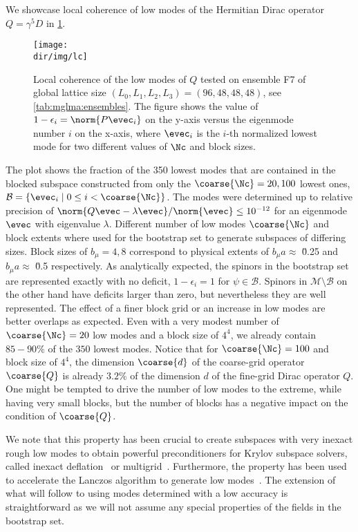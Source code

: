 We showcase local coherence of low modes of the Hermitian Dirac operator $Q = \gamma^{5} D$ in \cref{fig:lc}.
\begin{figure}
    \centering
    \texttt{[image: \\dir/img/lc]}
    \caption{Local coherence of the low modes of $Q$ tested on ensemble F7 of global lattice size $(L_0,L_1,L_2,L_3) = (96, 48, 48, 48)$, see \cref{tab:mglma:ensembles}. The figure shows the value of $1 - \epsilon_i = \norm{P \evec_i}$ on the y-axis versus the eigenmode number $i$ on the x-axis, where $\evec_i$ is the $i$-th normalized lowest mode for two different values of $\Nc$ and block sizes. \takenfull }
    \label{fig:lc}
\end{figure}
The plot shows the fraction of the \num{350} lowest modes that are contained in the blocked subspace constructed from only the $\coarse{\Nc} = 20, 100$ lowest ones, $\mathcal{B} = \{ \evec_i \mid 0 \leq i < \coarse{\Nc} \}$.
The modes were determined up to relative precision of $\norm{Q \evec - \lambda \evec}/\norm{\evec} \leq 10^{-12}$ for an eigenmode $\evec$ with eigenvalue $\lambda$.
Different number of low modes $\coarse{\Nc}$ and block extents where used for the bootstrap set to generate subspaces of differing sizes.
Block sizes of $b_{\mu} = 4, 8$ correspond to physical extents of $b_{\mu} a \approx $ \u{0.25}{\femto\metre} and $b_{\mu} a \approx $ \u{0.5}{\femto\metre} respectively.
As analytically expected, the spinors in the bootstrap set are represented exactly with no deficit, \ie $1 - \epsilon_i = 1$ for $\psi \in \mathcal{B}$.
Spinors in $\mathcal{M} \setminus \mathcal{B}$ on the other hand have deficits larger than zero, but nevertheless they are well represented.
The effect of a finer block grid or an increase in low modes are better overlaps as expected.
Even with a very modest number of $\coarse{\Nc}=20$ low modes and a block size of $4^4$, we already contain $85-90\%$ of the $350$ lowest modes.
Notice that for $\coarse{\Nc}=100$ and block size of $4^4$, the dimension $\coarse{d}$ of the coarse-grid operator $\coarse{Q}$ is already $3.2\%$ of the dimension $d$ of the fine-grid Dirac operator $Q$.
One might be tempted to drive the number of low modes to the extreme, while having very small blocks, but the number of blocks has a negative impact on the condition of $\coarse{Q}$.

We note that this property has been crucial to create subspaces with very inexact rough low modes to obtain powerful preconditioners for Krylov subspace solvers, called inexact deflation~\cite{Luescher2007} or multigrid~\cite{Babich:2010qb}.
Furthermore, the property has been used to accelerate the Lanczos algorithm to generate low modes~\cite{Clark_2018}.
The extension of what will follow to using modes determined with a low accuracy is straightforward as we will not assume any special properties of the fields in the bootstrap set.

